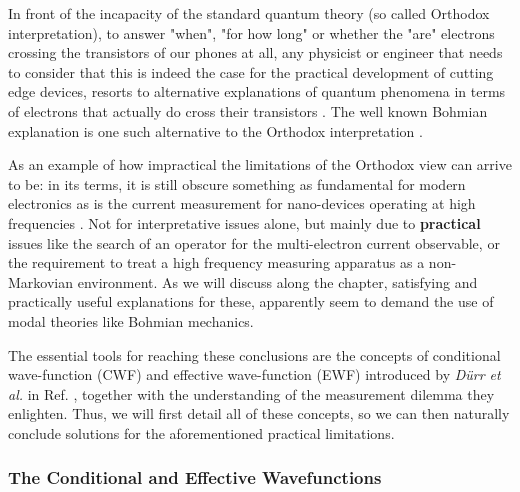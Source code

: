\documentclass[11pt, a4paper]{article} %
\begin{document}
\newpage
{}
\setcounter{page}{1}

\hspace*{4mm} In front of the incapacity of the standard quantum theory (so called Orthodox interpretation), to answer "when", "for how long" or whether the "are" electrons crossing the transistors of our phones at all, any physicist or engineer that needs to consider that this is indeed the case for the practical development of cutting edge devices, resorts to alternative explanations of quantum phenomena in terms of electrons that actually do cross their transistors \cite{where}. The well known Bohmian explanation is one such alternative to the Orthodox interpretation \cite{Bohm,Holland, Durr,JordiXavier}. 

As an example of how impractical the limitations of the Orthodox view can arrive to be: in its terms, it is still obscure something as fundamental for modern electronics as is the current measurement for nano-devices operating at high frequencies \cite{Thz}. Not for interpretative issues alone, but mainly due to {\bf practical} issues like the search of an operator for the multi-electron current observable, or the requirement to treat a high frequency measuring apparatus as a non-Markovian environment. As we will discuss along the chapter, satisfying and practically useful explanations for these, apparently seem to demand the use of modal theories like Bohmian mechanics. 

The essential tools for reaching these conclusions are the concepts of conditional wave-function (CWF) and effective wave-function (EWF) introduced by {\em Dürr et al.} in Ref. \cite{Absolute}, together with the understanding of the measurement dilemma they enlighten. Thus, we will first detail all of these concepts, so we can then naturally conclude solutions for the aforementioned practical limitations.
\vspace{-0.2cm}

\subsubsection*{The Conditional and Effective Wavefunctions}
\vspace{-0.2cm}
\end{document}
